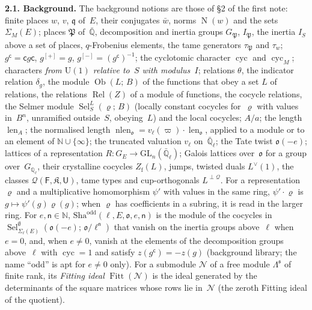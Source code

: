 \documentclass[11pt,a4paper]{article}
\newcommand{\len}{\operatorname{len}}
\newcommand{\m}[1]{\mbox{$#1$}}        %
\newcommand{\subhead}[1]{\par\addvspace{9pt plus 2pt}\Needspace{4\baselineskip}\noindent\textbf{#1}\enspace\ignorespaces}
\theoremstyle{plainx}
\theoremstyle{uprightx}
\newcommand{\NN}{\mathbb{N}}
\newcommand{\Qb}{\bar{\mathbb{Q}}}
\newcommand{\Qlb}{\bar{\mathbb{Q}}_\ell}
\newcommand{\Gl}{G_{\mathbb{Q}_\ell}}
\newcommand{\GE}[1]{G_{#1}}
\newcommand{\cyc}{\operatorname{cyc}}
\newcommand{\vl}{v_\ell}
\newcommand{\Sel}[4]{\operatorname{Sel}_{#2}^{#3}(#1;\,#4)}
\newcommand{\Ob}[2]{\operatorname{Ob}(#1;\,#2)}
\newcommand{\Rel}[1]{\operatorname{Rel}(#1)}
\newcommand{\pd}[2]{\Sigma_{#2}(#1)}
\newcommand{\inab}[1]{I_{#1}}
\newcommand{\cj}[1]{\bar{#1}}
\newcommand{\Nm}{\operatorname{N}}
\newcommand{\nlen}{\operatorname{nlen}}
\newcommand{\fo}{\mathfrak{o}}
\newcommand{\fP}{\mathfrak{P}}
\newcommand{\fq}{\mathfrak{q}}
\newcommand{\GL}{\mathrm{GL}}
\newcommand{\Zf}{Z_{\mathrm{f}}}
\newcommand{\Sha}{\mathrm{Sha}}
\begin{document}
\subhead{2.1. Background.} The background notions are those of §2 of the first note: finite places $w$, $v$,
$\fq$ of~$E$, their conjugates \m{\cj{w}}, norms \m{\Nm(w)} and the sets \m{\pd{E}{M}}; places $\fP$ of~\m{\Qb},
decomposition and inertia groups \m{G_{\fP}}, \m{I_{\fP}}, the inertia \m{\inab{S}} above a set of places, $q$-Frobenius
elements, the tame generators \m{\tau_{\fP}} and \m{\tau_w}; \m{g^{\mathsf c}=\mathsf{c}g\mathsf{c}}, \m{g^{[+]}=g},
\m{g^{[-]}=(g^{\mathsf c})^{-1}}; the cyclotomic character \m{\cyc} and \m{\cyc_M}; characters \emph{from
$\mathrm{U}(1)$ relative to~$S$ with modulus~$I$}; relations $\theta$, the indicator relation $\delta_g$, the
module \m{\Ob{L}{B}} of the functions that obey a set $L$ of relations, the relations \m{\Rel{Z}} of a module of
functions, the cocycle relations, the Selmer module \m{\Sel{\varrho}{S}{L}{B}} (locally constant cocycles
for~$\varrho$ with values in~$B^n$, unramified outside~$S$, obeying~$L$) and the local cocycles; \m{A/a}; the length
\m{\len_A}; the normalised length \m{\nlen_{\fo}=\vl(\varpi)\cdot\len_{\fo}}, applied to a module or to an element
of \m{\NN\cup\{\infty\}}; the truncated valuation \m{\vl} on~\m{\Qlb}; the Tate twist \m{\fo(-e)}; lattices of a
representation \m{R\colon\GE{E}\to\GL_n(\Qlb)}; Galois lattices over~$\fo$ for a group over~\m{\Gl}, their
crystalline cocycles \m{\Zf(L)}, jumps, twisted duals \m{L^{\vee}(1)}, the classes \m{\mathcal{Q}(\mathsf{F},\mathfrak{K},\mathsf{U})}, tame types
and cup-orthogonals \m{L^{\perp\mathcal{Q}}}. For a representation $\varrho$ and a multiplicative homomorphism
$\psi'$ with values in the same ring, \m{\psi'\cdot\varrho} is \m{g\mapsto\psi'(g)\varrho(g)}; when $\varrho$ has
coefficients in a subring, it is read in the larger ring. For \m{e,\mathsf{n}\in\NN}, \m{\Sha^{\mathrm{odd}}(\ell,E,\fo,e,\mathsf{n})}
is the module of the cocycles in \m{\Sel{\fo(-e)}{\pd{E}{\ell}}{\emptyset}{\fo/\ell^{\mathsf{n}}}} that vanish on the inertia groups
above~$\ell$ when \m{e=0}, and, when \m{e\ne0}, vanish at the elements of the decomposition groups above~$\ell$ with
\m{\cyc=1} and satisfy \m{z(g^{\mathsf c})=-z(g)} (background library; the name ``odd'' is apt for \m{e\ne0} only).
For a submodule \m{\mathcal{N}} of a free module $\Lambda^{\mathfrak{s}}$ of finite rank, its \emph{Fitting ideal}
\m{\operatorname{Fitt}(\mathcal{N})} is the ideal generated by the determinants of the square matrices whose rows
lie in~\m{\mathcal{N}} (the zeroth Fitting ideal of the quotient).
\end{document}
